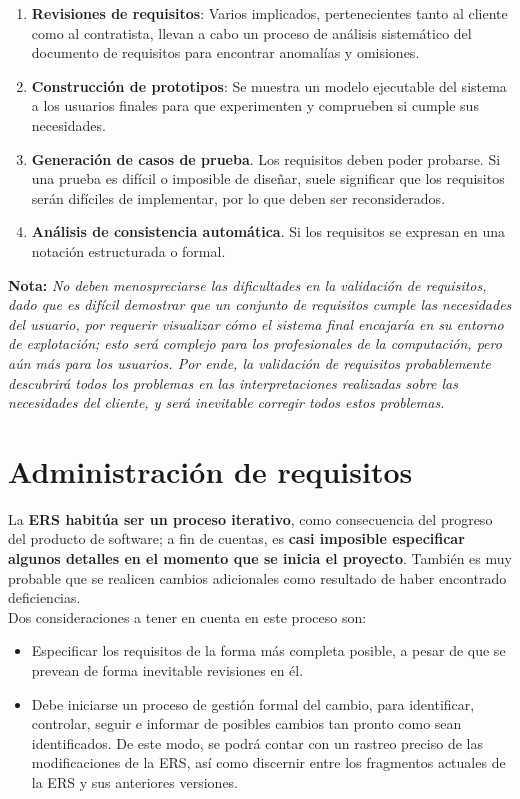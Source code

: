 \begin{enumerate}
    \item \textbf{Revisiones de requisitos}: Varios implicados, pertenecientes tanto al cliente como al contratista, llevan a cabo un proceso de análisis sistemático del documento de requisitos para encontrar anomalías y omisiones.
    \item \textbf{Construcción de prototipos}: Se muestra un modelo ejecutable del sistema a los usuarios finales para que experimenten y comprueben si cumple sus necesidades.
    \item \textbf{Generación de casos de prueba}. Los requisitos deben poder probarse. Si una prueba es difícil o imposible de diseñar, suele significar que los requisitos serán difíciles de implementar, por lo que deben ser reconsiderados.
    \item \textbf{Análisis de consistencia automática}. Si los requisitos se expresan en una notación estructurada o formal.
\end{enumerate}

\textbf{Nota:} \textit{No deben menospreciarse las dificultades en la validación de requisitos, dado que es difícil demostrar que un conjunto de requisitos cumple las necesidades del usuario, por requerir visualizar cómo el sistema final encajaría en su entorno de explotación; esto será complejo para los profesionales de la computación, pero aún más para los usuarios. Por ende, la validación de requisitos probablemente descubrirá todos los problemas en las interpretaciones realizadas sobre las necesidades del cliente, y será inevitable corregir todos estos problemas.}


\section{Administración de requisitos}

La \textbf{ERS habitúa ser un proceso iterativo}, como consecuencia del progreso del producto de software; a fin de cuentas, es \textbf{casi imposible especificar algunos detalles en el momento que se inicia el proyecto}. También es muy probable que se realicen cambios adicionales como resultado de haber encontrado deficiencias.\\

Dos consideraciones a tener en cuenta en este proceso son:

\begin{itemize}
    \item Especificar los requisitos de la forma más completa posible, a pesar de que se prevean de forma inevitable revisiones en él.
    \item Debe iniciarse un proceso de gestión formal del cambio, para identificar, controlar, seguir e informar de posibles cambios tan pronto como sean identificados. De este modo, se podrá contar con un rastreo preciso de las modificaciones de la ERS, así como discernir entre los fragmentos actuales de la ERS y sus anteriores versiones.
\end{itemize}

